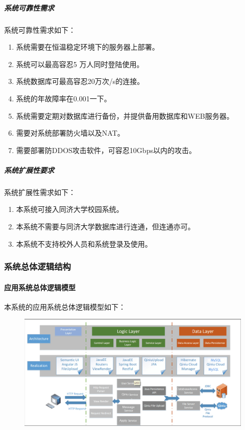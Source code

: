 \documentclass[UTF8]{ctexart}
\begin{document}
\subparagraph*{系统可靠性需求}
系统可靠性需求如下：\\
\begin{enumerate}[1)]
\item 系统需要在恒温稳定环境下的服务器上部署。
\item 系统可以最高容忍5 万人同时登陆使用。
\item 系统数据库可最高容忍20万次/s的连接。
\item 系统的年故障率在0.001一下。
\item 系统需要定期对数据库进行备份，并提供备用数据库和WEB服务器。
\item 需要对系统部署防火墙以及NAT。
\item 需要部署防DDOS攻击软件，可容忍10Gbps以内的攻击。
\end{enumerate}

\subparagraph*{系统扩展性要求}
系统扩展性需求如下：\\
\begin{enumerate}[1)]
\item 本系统可接入同济大学校园系统。
\item 本系统不需要与同济大学数据库进行连通，但连通亦可。
\item 本系统不支持校外人员和系统登录及使用。
\end{enumerate}

\subsubsection{系统总体逻辑结构}
\paragraph{应用系统总体逻辑模型}
本系统的应用系统总体逻辑模型如下：\\
\begin{figure}[H]
\centering
\includegraphics[width = 1.1\textwidth]{aaa.jpg}
\end{figure}
\end{document}
